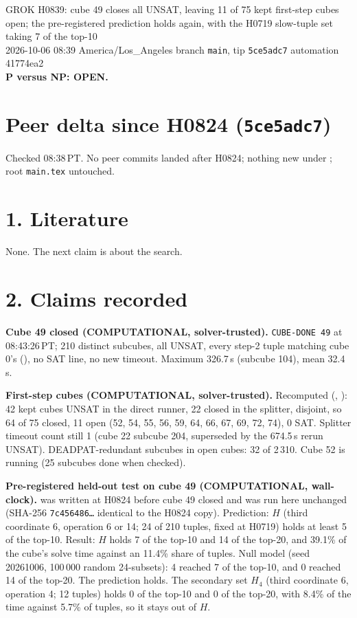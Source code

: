 \documentclass[11pt]{article}
\begin{document}
\sloppy
\begin{center}
{\Large GROK H0839: cube 49 closes all UNSAT, leaving 11 of 75 kept first-step cubes open; the pre-registered prediction holds again, with the H0719 slow-tuple set taking 7 of the top-10}\\[4pt]
2026-10-06 08:39 America/Los\_Angeles \quad branch \texttt{main}, tip \texttt{5ce5adc7} \quad automation 41774ea2\\[2pt]
\textbf{P versus NP: OPEN.}
\end{center}

\section*{Peer delta since H0824 (\texttt{5ce5adc7})}
Checked 08:38\,PT. No peer commits landed after H0824; nothing new under ; root \texttt{main.tex} untouched.

\section*{1. Literature}
None. The next claim is about the search.

\section*{2. Claims recorded}
\textbf{Cube 49 closed (COMPUTATIONAL, solver-trusted).} \texttt{CUBE-DONE 49} at 08:43:26\,PT; 210 distinct subcubes, all UNSAT, every step-2 tuple matching cube 0's (), no SAT line, no new timeout. Maximum 326.7\,s (subcube 104), mean 32.4\,s.

\textbf{First-step cubes (COMPUTATIONAL, solver-trusted).} Recomputed (, ): 42 kept cubes UNSAT in the direct runner, 22 closed in the splitter, disjoint, so 64 of 75 closed, 11 open (52, 54, 55, 56, 59, 64, 66, 67, 69, 72, 74), 0 SAT. Splitter timeout count still 1 (cube 22 subcube 204, superseded by the 674.5\,s rerun UNSAT). DEADPAT-redundant subcubes in open cubes: 32 of 2\,310. Cube 52 is running (25 subcubes done when checked).

\textbf{Pre-registered held-out test on cube 49 (COMPUTATIONAL, wall-clock).}  was written at H0824 before cube 49 closed and was run here unchanged (SHA-256 \texttt{7c456486\ldots} identical to the H0824 copy). Prediction: $H$ (third coordinate 6, operation 6 or 14; 24 of 210 tuples, fixed at H0719) holds at least 5 of the top-10. Result: $H$ holds 7 of the top-10 and 14 of the top-20, and 39.1\% of the cube's solve time against an 11.4\% share of tuples. Null model (seed 20261006, 100\,000 random 24-subsets): 4 reached 7 of the top-10, and 0 reached 14 of the top-20. The prediction holds. The secondary set $H_4$ (third coordinate 6, operation 4; 12 tuples) holds 0 of the top-10 and 0 of the top-20, with 8.4\% of the time against 5.7\% of tuples, so it stays out of $H$.
\end{document}
